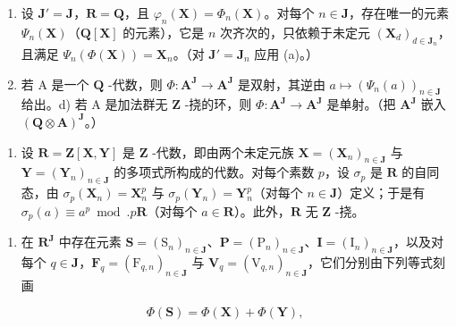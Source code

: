 \begin{enumerate}
\def\labelenumi{\alph{enumi})}
\setcounter{enumi}{1}
\item
  设 \(\mathbf{J}' = \mathbf{J}\)，\(\mathbf{R} = \mathbf{Q}\)，且 \(\varphi_n(\mathbf{X}) = \Phi_n(\mathbf{X})\)。对每个 \(n \in \mathbf{J}\)，存在唯一的元素 \(\Psi_n(\mathbf{X})\)（\(\mathbf{Q}[\mathbf{X}]\) 的元素），它是 \(n\) 次齐次的，只依赖于未定元 \((\mathbf{X}_d)_{d \in \mathbf{J}_n}\)，且满足 \(\Psi_n(\Phi(\mathbf{X})) = \mathbf{X}_n\)。（对 \(\mathbf{J}' = \mathbf{J}_{n}\) 应用 (a)。）
\item
  若 A 是一个 \(\mathbf{Q}\) -代数，则 \(\Phi: \mathbf{A}^{\mathbf{J}} \to \mathbf{A}^{\mathbf{J}}\) 是双射，其逆由 \(a \mapsto (\Psi_n(a))_{n \in \mathbf{J}}\) 给出。d) 若 A 是加法群无 \(\mathbf{Z}\) -挠的环，则 \(\Phi: \mathbf{A}^{\mathbf{J}} \to \mathbf{A}^{\mathbf{J}}\) 是单射。（把 \(\mathbf{A}^{\mathbf{J}}\) 嵌入 \((\mathbf{Q} \otimes \mathbf{A})^{\mathbf{J}}\)。）
\end{enumerate}

\begin{enumerate}
\def\labelenumi{\arabic{enumi})}
\setcounter{enumi}{33}
\tightlist
\item
  设 \(\mathbf{R} = \mathbf{Z}[\mathbf{X},\mathbf{Y}]\) 是 \(\mathbf{Z}\) -代数，即由两个未定元族 \(\mathbf{X} = (\mathbf{X}_n)_{n\in \mathbf{J}}\) 与 \(\mathbf{Y} = (\mathbf{Y}_n)_{n\in \mathbf{J}}\) 的多项式所构成的代数。对每个素数 \(p\)，设 \(\sigma_p\) 是 \(\mathbf{R}\) 的自同态，由 \(\sigma_p(\mathbf{X}_n) = \mathbf{X}_n^p\) 与 \(\sigma_p(\mathbf{Y}_n) = \mathbf{Y}_n^p\)（对每个 \(n\in \mathbf{J}\)）定义；于是有 \(\sigma_p(a)\equiv a^p\bmod .p\mathbf{R}\)（对每个 \(a\in \mathbf{R}\)）。此外，\(\mathbf{R}\) 无 \(\mathbf{Z}\) -挠。
\end{enumerate}

\begin{enumerate}
\def\labelenumi{\alph{enumi})}
\tightlist
\item
  在 \(\mathbf{R}^{\mathbf{J}}\) 中存在元素 \(\mathbf{S} = (\mathrm{S}_n)_{n\in \mathbf{J}}\)、\(\mathbf{P} = (\mathrm{P}_n)_{n\in \mathbf{J}}\)、\(\mathbf{I} = (\mathrm{I}_n)_{n\in \mathbf{J}}\)，以及对每个 \(q\in \mathbf{J}\)，\(\mathbf{F}_q = (\mathrm{F}_{q,n})_{n\in \mathbf{J}}\) 与 \(\mathbf{V}_q = (\mathrm{V}_{q,n})_{n\in \mathbf{J}}\)，它们分别由下列等式刻画
\end{enumerate}

\[
\Phi (\mathbf {S}) = \Phi (\mathbf {X}) + \Phi (\mathbf {Y}),
\]

